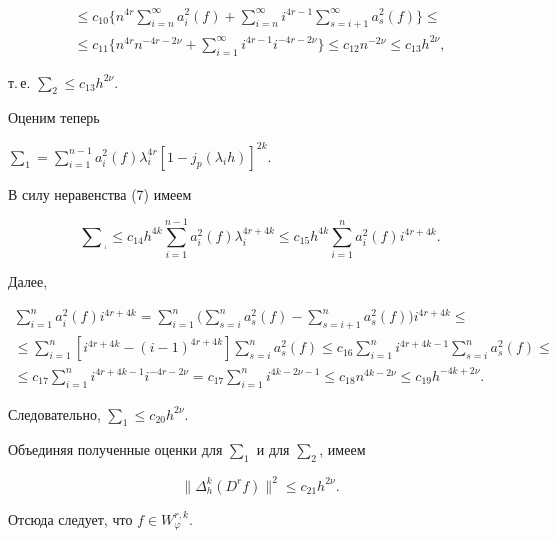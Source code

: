 \begin{pf}
\begin{multline*}
% 


\le c_{10}\bigg\{n^{4r}\sum^\infty_{i=n}a^2_i(f)+ 


\sum^\infty_{i=n}i^{4r-1}\sum^\infty_{s=i+1}a^2_s(f)\bigg\}\le \\ 


% 


\le c_{11}\bigg\{n^{4r}n^{-4r-2\nu}+\sum^\infty_{i=1} 


i^{4r-1}i^{-4r-2\nu}\bigg\}\le c_{12}n^{-2\nu}\le c_{13}h^{2\nu}, 


\end{multline*} 


т.\,е. $\sum_2\le c_{13}h^{2\nu}$. 


Оценим теперь 


$\sum_1=\sum\limits^{n-1}_{i=1}a^2_i(f)\lambda^{4r}_i[1-j_p(\lambda_i 


h)]^{2k}$. 


В силу неравенства (7) имеем 


$$ 


\sum{}_{{}_{{}_1}}\le c_{14}h^{4k}\sum^{n-1}_{i=1}a^2_i(f) 


\lambda^{4r+4k}_i\le c_{15}h^{4k}\sum^n_{i=1} 


a^2_i(f)i^{4r+4k}. 


$$ 


Далее, 


\begin{multline*} 


\sum^n_{i=1}a^2_i(f)i^{4r+4k}=\sum^n_{i=1}\bigg( 


\sum^n_{s=i}a^2_s(f)-\sum^n_{s=i+1}a^2_s(f)\bigg)i^{4r+4k}\le \\ 


% 


\le\sum^n_{i=1}[i^{4r+4k}-(i-1)^{4r+4k}]\sum^n_{s=i}a^2_s(f)\le 


c_{16}\sum^n_{i=1}i^{4r+4k-1}\sum^n_{s=i}a^2_s(f)\le \\ 


% 


\le c_{17}\sum^n_{i=1}i^{4r+4k-1}i^{-4r-2\nu}=c_{17} 


\sum^n_{i=1}i^{4k-2\nu-1}\le c_{18}n^{4k-2\nu}\le 


c_{19}h^{-4k+2\nu}. 


\end{multline*} 


Следовательно, $\sum_1\le c_{20}h^{2\nu}$. 


Объединяя полученные оценки для $\sum_1$ и для $\sum_2$, имеем 


$$ 


\|\Delta^k_h(D^r f)\|^2\le c_{21}h^{2\nu}. 


$$ 


Отсюда следует, что $f\in W^{r,k}_\varphi$. 


\end{pf} 


